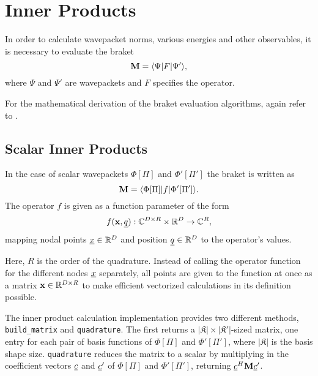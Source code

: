 \section{Inner Products}

In order to calculate wavepacket norms, various energies and other observables,
it is necessary to evaluate the braket
\begin{equation}
  \label{eq:braket}
  \mathbf{M} = \langle \Psi | F | \Psi' \rangle,
\end{equation}
where $\Psi$ and $\Psi'$ are wavepackets and $F$ specifies the operator.

For the mathematical derivation of the braket evaluation algorithms, again refer
to \cite{B_master_thesis}.


\subsection{Scalar Inner Products}

In the case of scalar wavepackets $\Phi[\Pi]$ and $\Phi'[\Pi']$ the braket is written as
\begin{equation}
  \mathbf{M} = \langle \Phi[\Pi] | f | \Phi'[\Pi'] \rangle.
\end{equation}
The operator $f$ is given as a function parameter of the form
\begin{equation}
  f(\mathbf{x}, \underline{q}) : \mathbb{C}^{D \times R} \times \mathbb{R}^D \rightarrow
  \mathbb{C}^R,
\end{equation}
mapping nodal points $\underline{x} \in \mathbb{R}^D$ and position
$\underline{q} \in \mathbb{R}^D$ to the operator's values.

Here, $R$ is the order of the quadrature.
Instead of calling the operator function for the different nodes $\underline{x}$
separately, all points are given to the function at once as a matrix $\mathbf{x}
\in \mathbb{R}^{D \times R}$ to make efficient vectorized calculations in its
definition possible.

The inner product calculation implementation provides two different methods,
\texttt{build\_matrix} and \texttt{quadrature}.
The first returns a $|\mathfrak{K}| \times |\mathfrak{K'}|$-sized matrix, one
entry for each pair of basis functions of $\Phi[\Pi]$ and $\Phi'[\Pi']$, where
$|\mathfrak{K}|$ is the basis shape size.
\texttt{quadrature} reduces the matrix to a scalar by multiplying in the
coefficient vectors $\underline{c}$ and $\underline{c}'$ of $\Phi[\Pi]$ and $\Phi'[\Pi']$, returning
$\underline{c}^H \mathbf{M} \underline{c}'$.

